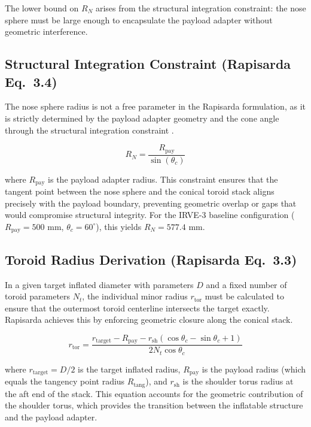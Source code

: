 \noindent The lower bound on $R_N$ arises from the structural integration constraint: the nose sphere must be large enough to encapsulate the payload adapter without geometric interference.

\subsection{Structural Integration Constraint (Rapisarda Eq.\ 3.4)}

The nose sphere radius is not a free parameter in the Rapisarda formulation, as it is strictly determined by the payload adapter geometry and the cone angle through the structural integration constraint \cite{rapisarda2023mdao}.

\begin{equation}
    R_N = \frac{R_{\text{pay}}}{\sin(\theta_c)}
    \label{eq:structural_integration}
\end{equation}

\noindent where $R_{\text{pay}}$ is the payload adapter radius. This constraint ensures that the tangent point between the nose sphere and the conical toroid stack aligns precisely with the payload boundary, preventing geometric overlap or gaps that would compromise structural integrity. For the IRVE-3 baseline configuration ($R_{\text{pay}} = 500$ mm, $\theta_c = 60^\circ$), this yields $R_N = 577.4$ mm.

\subsection{Toroid Radius Derivation (Rapisarda Eq.\ 3.3)}

In a given target inflated diameter with parameters $D$ and a fixed number of toroid parameters $N_t$, the individual minor radius $r_{\text{tor}}$ must be calculated to ensure that the outermost toroid centerline intersects the target exactly. Rapisarda \cite{rapisarda2023mdao} achieves this by enforcing geometric closure along the conical stack.

\begin{equation}
    r_{\text{tor}} = \frac{r_{\text{target}} - R_{\text{pay}} - r_{\text{sh}} \left( \cos\theta_c - \sin\theta_c + 1 \right)}{2 N_t \cos\theta_c}
    \label{eq:toroid_radius}
\end{equation}

\noindent where $r_{\text{target}} = D/2$ is the target inflated radius, $R_{\text{pay}}$ is the payload radius (which equals the tangency point radius $R_{\text{tang}}$), and $r_{\text{sh}}$ is the shoulder torus radius at the aft end of the stack. This equation accounts for the geometric contribution of the shoulder torus, which provides the transition between the inflatable structure and the payload adapter.

